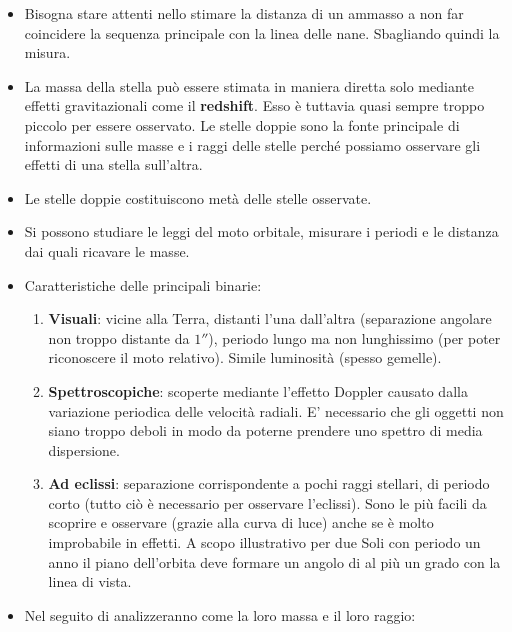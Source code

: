 \documentclass[11pt,a4paper]{article}
\begin{document}
\begin{itemize}
\item Bisogna stare attenti nello stimare la distanza di un ammasso a non far coincidere la sequenza principale con la linea delle nane. Sbagliando quindi la misura.

\item La massa della stella può essere stimata in maniera diretta solo mediante effetti gravitazionali come il \textbf{redshift}. Esso è tuttavia quasi sempre troppo piccolo per essere osservato. Le stelle doppie sono la fonte principale di informazioni sulle masse e i raggi delle stelle perché possiamo osservare gli effetti di una stella sull'altra.

\item Le stelle doppie costituiscono metà delle stelle osservate.

\item Si possono studiare le leggi del moto orbitale, misurare i periodi e le distanza dai quali ricavare le masse.

\item Caratteristiche delle principali binarie:

\begin{enumerate}
\item \textbf{Visuali}: vicine alla Terra, distanti l'una dall'altra (separazione angolare non troppo distante da $1''$), periodo lungo ma non lunghissimo (per poter riconoscere il moto relativo). Simile luminosità (spesso gemelle).
\item \textbf{Spettroscopiche}: scoperte mediante l'effetto Doppler causato dalla variazione periodica delle velocità radiali. E' necessario che gli oggetti non siano troppo deboli in modo da poterne prendere uno spettro di media dispersione.
\item \textbf{Ad eclissi}: separazione corrispondente a pochi raggi stellari, di periodo corto (tutto ciò è necessario per osservare l'eclissi). Sono le più facili da scoprire e osservare (grazie alla curva di luce) anche se è molto improbabile in effetti. A scopo illustrativo per due Soli con periodo un anno il piano dell'orbita deve formare un angolo di al più un grado con la linea di vista.
\end{enumerate}

\item Nel seguito di analizzeranno come la loro massa e il loro raggio:


\end{itemize}
\end{document}
